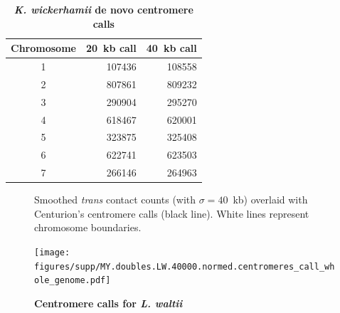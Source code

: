 \begin{table}[ht!]
\caption{\textbf{\textit{K. wickerhamii} de novo centromere calls}}
\begin{center}
\begin{tabular}{c | r r}
\textbf{Chromosome} & \textbf{20~kb call} & \textbf{40~kb call} \\
\hline
1 & \num[group-separator={\,}]{107436} & \num[group-separator={\,}]{108558} \\
2 & \num[group-separator={\,}]{807861} & \num[group-separator={\,}]{809232} \\
3 & \num[group-separator={\,}]{290904} & \num[group-separator={\,}]{295270} \\
4 & \num[group-separator={\,}]{618467} & \num[group-separator={\,}]{620001} \\
5 & \num[group-separator={\,}]{323875} & \num[group-separator={\,}]{325408} \\
6 & \num[group-separator={\,}]{622741} & \num[group-separator={\,}]{623503} \\
7 & \num[group-separator={\,}]{266146} & \num[group-separator={\,}]{264963} \\
\end{tabular}
\end{center}
\end{table}

\clearpage


\begin{figure}[ht!]
\caption{\textbf{Centromere calls for \textit{L. waltii}}}{
Smoothed \textit{trans} contact counts (with $\sigma=40$~kb) overlaid with
Centurion's centromere calls (black line). White lines represent chromosome
boundaries.
}
\begin{center}
\texttt{[image: figures/supp/MY.doubles.LW.40000.normed.centromeres\_call\_whole\_genome.pdf]}
\end{center}
\label{suppfig:LW_calls}
\end{figure}


